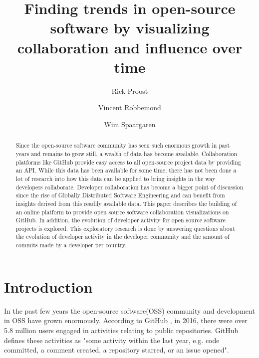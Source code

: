 \documentclass[acmtog, authorversion]{acmart}
\begin{document}
\title{Finding trends in open-source software by visualizing collaboration and influence over time} 

\author{Rick Proost}

\author{Vincent Robbemond}

\author{Wim Spaargaren}

\begin{abstract}
Since the open-source software community has seen such enormous growth in past years and remains to grow still, a wealth of data has become available.
Collaboration platforms like GitHub provide easy access to all open-source project data by providing an API.
While this data has been available for some time, there has not been done a lot of research into how this data can be applied to bring insights in the way developers collaborate.
Developer collaboration has become a bigger point of discussion since the rise of Globally Distributed Software Engineering and can benefit from insights derived from this readily available data.
This paper describes the building of an online platform to provide open source software collaboration visualizations on GitHub.
In addition, the evolution of developer activity for open source software projects  is explored.
This exploratory research is done by answering questions about the evolution of developer activity in the developer community and the amount of commits made by a developer per country.
\end{abstract}


\maketitle

\section{Introduction}
In the past few years the open-source software(OSS) community and development in OSS have grown enormously.
According to GitHub \cite{GHOctoverse}, in 2016, there were over 5.8 million users engaged in activities relating to public repositories.
GitHub defines these activities as "some activity within the last year, e.g. code committed, a comment created, a repository starred, or an issue opened".
\end{document}

